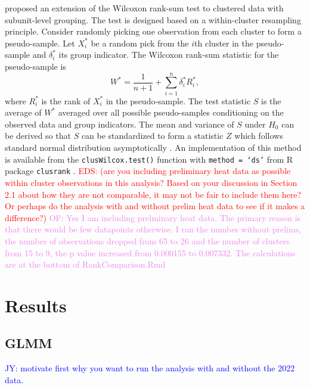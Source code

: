 \documentclass[12pt, letterpaper, titlepage]{article}
\newcommand{\jy}[1]{\textcolor{blue}{JY: #1}}
\newcommand{\eds}[1]{\textcolor{red}{EDS: (#1)}}
\newcommand{\of}[1]{\textcolor{violet}{OF: #1}}
\begin{document}
\citet{datta2005rank} proposed an extension of the Wilcoxon rank-sum test to
clustered data with subunit-level grouping. The test is designed based on a
within-cluster resampling principle. Consider randomly picking one observation
from each cluster to form a pseudo-sample. Let $X_i^*$ be a random pick from the
$i$th cluster in the pseudo-sample and $\delta_i^*$ its group indicator. The
Wilcoxon rank-sum statistic for the pseudo-sample is
\[
W^* = \frac{1}{n + 1} + \sum_{i=1}^{n} \delta_{i}^{*} R_{i}^{*},
\]
where $R_{i}^{*}$ is the rank of $X_{i}^{*}$ in the pseudo-sample.
The test statistic $S$ is the average of $W^*$ averaged over all possible
pseudo-samples conditioning on the observed data and group indicators.
The mean and variance of $S$ under $H_0$ can be derived so that $S$ can be
standardized to form a statistic $Z$ which follows standard normal distribution
asymptotically \citep[p.910]{datta2005rank}. An implementation of this method is
available from the \texttt{clusWilcox.test()} function with
\texttt{method = `ds'} from R package \texttt{clusrank}
\citep{jiang2017wilcoxon}.
\eds{are you including preliminary heat data as possible within cluster 
observations in this analysis?  Based on your 
discussion in Section 2.1 about how they are not comparable, it may not be fair 
to include them here?  Or perhaps do the analysis with and without prelim heat
data to see if it makes a difference?}
\of{Yes I am including prelminary heat data.  The primary reason is that there
would be few datapoints otherwise.  I ran the numbes without prelims, the number
of observations dropped from 65 to 26 and the number of clusters from 15 to 9, the
p value increased from 0.000155 to 0.007332.
The calculations are at the bottom of RankComparison.Rmd}


\section{Results} \label{sec:Results}

\subsection{GLMM} \label{subsec:Results_GLMM}

\jy{motivate first why you want to run the analysis with and without the 2022 data.}
\end{document}
